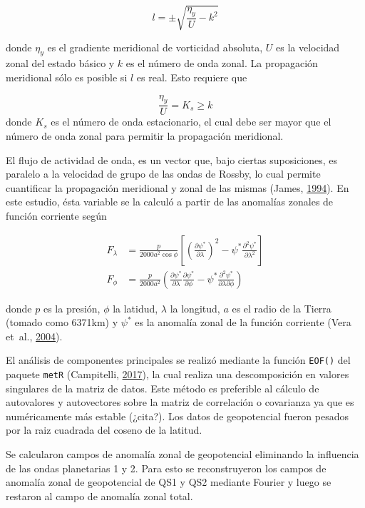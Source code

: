 \documentclass[spanish,a4paper,12pt,oneside]{book}
\begin{document}
\[
l = \pm \sqrt{\frac{\eta_{y}}{U} - k^2}
\]

donde \(\eta_{y}\) es el gradiente meridional de vorticidad absoluta,
\(U\) es la velocidad zonal del estado básico y \(k\) es el número de
onda zonal. La propagación meridional sólo es posible si \(l\) es real.
Esto requiere que

\[
\frac{\eta_{y}}{U} = K_s \ge k 
\] donde \(K_s\) es el número de onda estacionario, el cual debe ser
mayor que el número de onda zonal para permitir la propagación
meridional.

El flujo de actividad de onda, es un vector que, bajo ciertas
suposiciones, es paralelo a la velocidad de grupo de las ondas de
Rossby, lo cual permite cuantificar la propagación meridional y zonal de
las mismas (James, \protect\hyperlink{ref-James}{1994}). En este
estudio, ésta variable se la calculó a partir de las anomalías zonales
de función corriente según

\[
\begin{aligned}
F_\lambda &= \frac{p}{2000a^2\cos\phi}\left[ \left( \frac{\partial \psi^*}{\partial \lambda} \right)^2 - \psi^*\frac{\partial^2 \psi^*}{\partial \lambda^2}  \right] \\
F_\phi &= \frac{p}{2000a^2} \left( \frac{\partial \psi^*}{\partial \lambda}\frac{\partial \psi^*}{\partial \phi}  - \psi^* \frac{\partial^2 \psi^*}{\partial \lambda \partial \phi} \right) 
\end{aligned}
\]

donde \(p\) es la presión, \(\phi\) la latidud, \(\lambda\) la longitud,
\(a\) es el radio de la Tierra (tomado como 6371km) y \(\psi^*\) es la
anomalía zonal de la función corriente (Vera et~al.,
\protect\hyperlink{ref-Vera2004}{2004}).

El análisis de componentes principales se realizó mediante la función
\texttt{EOF()} del paquete \texttt{metR} (Campitelli,
\protect\hyperlink{ref-R-metR}{2017}), la cual realiza una
descomposición en valores singulares de la matriz de datos. Este método
es preferible al cálculo de autovalores y autovectores sobre la matriz
de correlación o covarianza ya que es numéricamente más estable
(¿cita?). Los datos de geopotencial fueron pesados por la raiz cuadrada
del coseno de la latitud.

Se calcularon campos de anomalía zonal de geopotencial eliminando la
influencia de las ondas planetarias 1 y 2. Para esto se reconstruyeron
los campos de anomalía zonal de geopotencial de QS1 y QS2 mediante
Fourier y luego se restaron al campo de anomalía zonal total.
\end{document}

